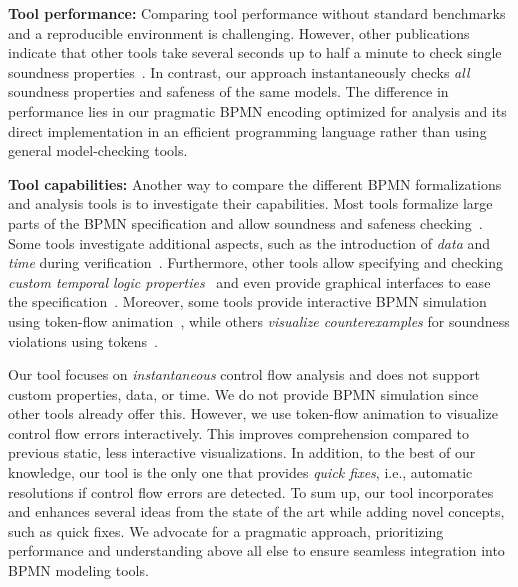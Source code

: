 \documentclass[
onecolumn, %
]{ceurart}
\begin{document}
\textbf{Tool performance:}
Comparing tool performance without standard benchmarks and a reproducible environment is challenging.
However, other publications indicate that other tools take several seconds up to half a minute to check single soundness properties~\cite{krauterHigherorderTransformationApproach2024,corradiniFormalApproachAnalysis2021,houhouFirstOrderLogicVerification2022}.
In contrast, our approach instantaneously checks \textit{all} soundness properties and safeness of the same models.
The difference in performance lies in our pragmatic BPMN encoding optimized for analysis and its direct implementation in an efficient programming language rather than using general model-checking tools.

\textbf{Tool capabilities:}
Another way to compare the different BPMN formalizations and analysis tools is to investigate their capabilities.
Most tools formalize large parts of the BPMN specification and allow soundness and safeness checking~\cite{krauterHigherorderTransformationApproach2024,krauterFormalizationAnalysisBPMN2023,corradiniFormalApproachAnalysis2021,houhouFirstOrderLogicVerification2022}.
Some tools investigate additional aspects, such as the introduction of \textit{data} and \textit{time} during verification~\cite{houhouFirstOrderLogicVerification2022,corradiniFormalisingAnimatingMultiple2022}.
Furthermore, other tools allow specifying and checking \textit{custom temporal logic properties}~\cite{krauterFormalizationAnalysisBPMN2023,corradiniFormalApproachAnalysis2021} and even provide graphical interfaces to ease the specification~\cite{krauterHigherorderTransformationApproach2024}.
Moreover, some tools provide interactive BPMN simulation using token-flow animation~\cite{corradiniFormalisingAnimatingMultiple2022,camundaservicesgmbhBpmnjsTokenSimulation2024}, while others \textit{visualize counterexamples} for soundness violations using tokens~\cite{houhouFirstOrderLogicVerification2022}.

Our tool focuses on \textit{instantaneous} control flow analysis and does not support custom properties, data, or time.
We do not provide BPMN simulation since other tools already offer this.
However, we use token-flow animation to visualize control flow errors interactively.
This improves comprehension compared to previous static, less interactive visualizations.
In addition, to the best of our knowledge, our tool is the only one that provides \textit{quick fixes}, i.e., automatic resolutions if control flow errors are detected.
To sum up, our tool incorporates and enhances several ideas from the state of the art while adding novel concepts, such as quick fixes.
We advocate for a pragmatic approach, prioritizing performance and understanding above all else to ensure seamless integration into BPMN modeling tools.
\end{document}
